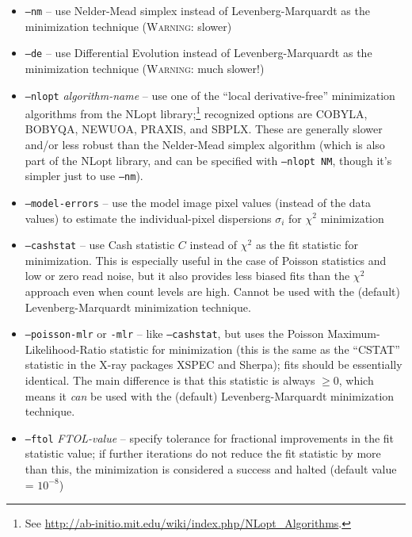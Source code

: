 \documentclass[10pt,a4paper,article]{memoir}
\newcommand{\chisquare}{\ensuremath{\chi^{2}}}
\begin{document}
\begin{itemize}
\bigskip

\item \texttt{--nm} -- use Nelder-Mead simplex instead of Levenberg-Marquardt as
the minimization technique (\textsc{Warning}: slower)

\item \texttt{--de} -- use Differential Evolution instead of Levenberg-Marquardt as
the minimization technique (\textsc{Warning}: much slower!)

\item \texttt{--nlopt} \textit{algorithm-name} -- use one of the
``local derivative-free'' minimization algorithms from the NLopt
library;\footnote{See
\url{http://ab-initio.mit.edu/wiki/index.php/NLopt_Algorithms}.}
recognized options are COBYLA, BOBYQA, NEWUOA, PRAXIS, and SBPLX. These
are generally slower and/or less robust than the Nelder-Mead simplex
algorithm (which is also part of the NLopt library, and can be specified
with \texttt{--nlopt NM}, though it's simpler just to use \texttt{--nm}).

\bigskip

\item \texttt{--model-errors} -- use the model image pixel values
(instead of the data values) to estimate the individual-pixel dispersions
$\sigma_{i}$ for \chisquare{} minimization

\item \texttt{--cashstat} -- use Cash statistic $C$ instead of \chisquare{}
as the fit statistic for minimization. This is especially useful in the
case of Poisson statistics and low or zero read noise, but it also provides less
biased fits than the \chisquare{} approach even when count levels are
high. Cannot be used with the (default) Levenberg-Marquardt minimization
technique.

\item \texttt{--poisson-mlr} or \texttt{-mlr} -- like \texttt{--cashstat}, but uses the
Poisson Maximum-Likelihood-Ratio statistic for minimization (this is
the same as the ``CSTAT'' statistic in the X-ray packages XSPEC and
Sherpa); fits should be essentially identical. The main difference is that this statistic is
always $\ge 0$, which means it \textit{can} be used with the (default)
Levenberg-Marquardt minimization technique.

\item \texttt{--ftol} \textit{FTOL-value} -- specify tolerance for
fractional improvements in the fit statistic value; if further iterations do 
not reduce the fit statistic by more than this, the minimization is considered a 
success and halted (default value = $10^{-8}$)


\end{itemize}
\end{document}
